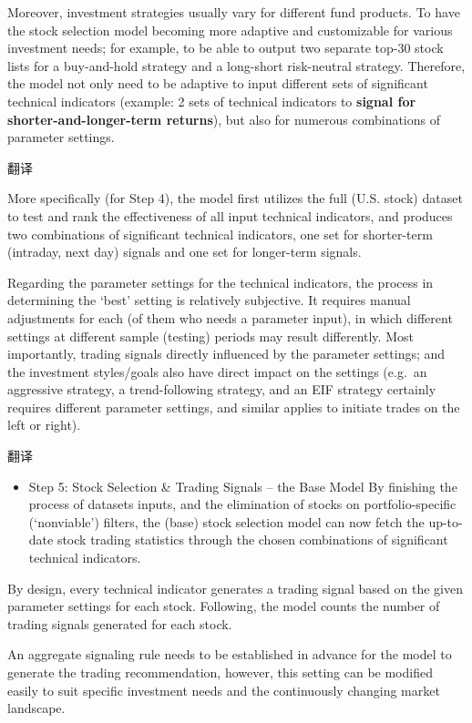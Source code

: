 \documentclass[
]{book}
\providecommand{\tightlist}{%
  \setlength{\itemsep}{0pt}\setlength{\parskip}{0pt}}
\begin{document}
Moreover, investment strategies usually vary for different fund
products. To have the stock selection model becoming more adaptive and
customizable for various investment needs; for example, to be able to
output two separate top-30 stock lists for a buy-and-hold strategy and a
long-short risk-neutral strategy. Therefore, the model not only need to
be adaptive to input different sets of significant technical indicators
(example: 2 sets of technical indicators to \textbf{signal for
shorter-and-longer-term returns}), but also for numerous combinations of
parameter settings.

翻译

More specifically (for Step 4), the model first utilizes the full (U.S.
stock) dataset to test and rank the effectiveness of all input technical
indicators, and produces two combinations of significant technical
indicators, one set for shorter-term (intraday, next day) signals and
one set for longer-term signals.

Regarding the parameter settings for the technical indicators, the
process in determining the `best' setting is relatively subjective. It
requires manual adjustments for each (of them who needs a parameter
input), in which different settings at different sample (testing)
periods may result differently. Most importantly, trading signals
directly influenced by the parameter settings; and the investment
styles/goals also have direct impact on the settings (e.g.~an aggressive
strategy, a trend-following strategy, and an EIF strategy certainly
requires different parameter settings, and similar applies to initiate
trades on the left or right).

翻译

\begin{itemize}
\tightlist
\item
  Step 5: Stock Selection \& Trading Signals -- the Base Model By
  finishing the process of datasets inputs, and the elimination of
  stocks on portfolio-specific (`nonviable') filters, the (base) stock
  selection model can now fetch the up-to-date stock trading statistics
  through the chosen combinations of significant technical indicators.
\end{itemize}

By design, every technical indicator generates a trading signal based on
the given parameter settings for each stock. Following, the model counts
the number of trading signals generated for each stock.

An aggregate signaling rule needs to be established in advance for the
model to generate the trading recommendation, however, this setting can
be modified easily to suit specific investment needs and the
continuously changing market landscape.
\end{document}
